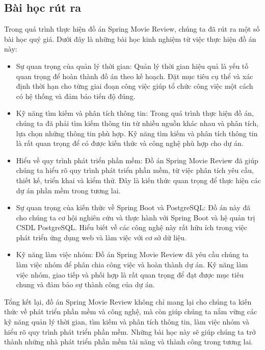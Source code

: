 \documentclass[12pt]{article}
\begin{document}
\subsection{Bài học rút ra}
Trong quá trình thực hiện đồ án Spring Movie Review, chúng ta đã rút ra một số bài học quý giá. Dưới đây là những bài học kinh nghiệm từ việc thực hiện đồ án này:
\begin{itemize}
    \item Sự quan trọng của quản lý thời gian: Quản lý thời gian hiệu quả là yếu tố quan trọng để hoàn thành đồ án theo kế hoạch. Đặt mục tiêu cụ thể và xác định thời hạn cho từng giai đoạn công việc giúp tổ chức công việc một cách có hệ thống và đảm bảo tiến độ đúng.

    \item Kỹ năng tìm kiếm và phân tích thông tin: Trong quá trình thực hiện đồ án, chúng ta đã phải tìm kiếm thông tin từ nhiều nguồn khác nhau và phân tích, lựa chọn những thông tin phù hợp. Kỹ năng tìm kiếm và phân tích thông tin là rất quan trọng để có được kiến thức và công nghệ phù hợp cho dự án.

    \item Hiểu về quy trình phát triển phần mềm: Đồ án Spring Movie Review đã giúp chúng ta hiểu rõ quy trình phát triển phần mềm, từ việc phân tích yêu cầu, thiết kế, triển khai và kiểm thử. Đây là kiến thức quan trọng để thực hiện các dự án phần mềm trong tương lai.

    \item Sự quan trọng của kiến thức về Spring Boot và PostgreSQL: Đồ án này đã cho chúng ta cơ hội nghiên cứu và thực hành với Spring Boot và hệ quản trị CSDL PostgreSQL. Hiểu biết về các công nghệ này rất hữu ích trong việc phát triển ứng dụng web và làm việc với cơ sở dữ liệu.

    \item Kỹ năng làm việc nhóm: Đồ án Spring Movie Review đã yêu cầu chúng ta làm việc nhóm để phân chia công việc và hoàn thành dự án. Kỹ năng làm việc nhóm, giao tiếp và phối hợp là rất quan trọng để đạt được mục tiêu chung và đảm bảo sự thành công của dự án.
\end{itemize}
Tổng kết lại, đồ án Spring Movie Review không chỉ mang lại cho chúng ta kiến thức về phát triển phần mềm và công nghệ, mà còn giúp chúng ta nắm vững các kỹ năng quản lý thời gian, tìm kiếm và phân tích thông tin, làm việc nhóm và hiểu rõ quy trình phát triển phần mềm. Những bài học này sẽ giúp chúng ta trở thành những nhà phát triển phần mềm tài năng và thành công trong tương lai.
\end{document}
